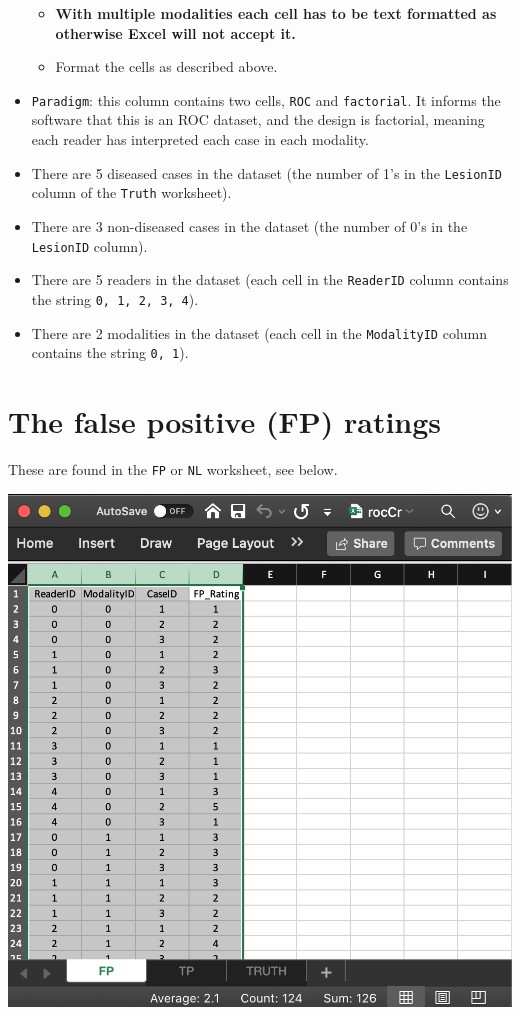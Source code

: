 \documentclass[
]{book}
\providecommand{\tightlist}{%
  \setlength{\itemsep}{0pt}\setlength{\parskip}{0pt}}
\begin{document}
\begin{itemize}
  \begin{itemize}
  \tightlist
  \item
    \textbf{With multiple modalities each cell has to be text formatted as otherwise Excel will not accept it.}
  \item
    Format the cells as described above.
  \end{itemize}
\item
  \texttt{Paradigm}: this column contains two cells, \texttt{ROC} and \texttt{factorial}. It informs the software that this is an ROC dataset, and the design is factorial, meaning each reader has interpreted each case in each modality.
\item
  There are 5 diseased cases in the dataset (the number of 1's in the \texttt{LesionID} column of the \texttt{Truth} worksheet).
\item
  There are 3 non-diseased cases in the dataset (the number of 0's in the \texttt{LesionID} column).
\item
  There are 5 readers in the dataset (each cell in the \texttt{ReaderID} column contains the string \texttt{0,\ 1,\ 2,\ 3,\ 4}).
\item
  There are 2 modalities in the dataset (each cell in the \texttt{ModalityID} column contains the string \texttt{0,\ 1}).
\end{itemize}

\hypertarget{quick-start-data-fp-worksheet}{%
\section{The false positive (FP) ratings}\label{quick-start-data-fp-worksheet}}

These are found in the \texttt{FP} or \texttt{NL} worksheet, see below.

\includegraphics[width=1\textwidth,height=\textheight]{images/quick-start/rocCrFp.png}
\end{document}
